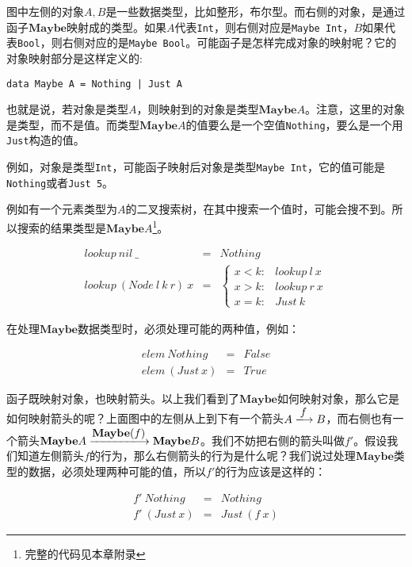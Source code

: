 \documentclass{article}
\begin{document}
\begin{example}
图中左侧的对象$A, B$是一些数据类型，比如整形，布尔型。而右侧的对象，是通过函子$\mathbf{Maybe}$映射成的类型。如果$A$代表\texttt{Int}，则右侧对应是\texttt{Maybe Int}，$B$如果代表\texttt{Bool}，则右侧对应的是\texttt{Maybe Bool}。可能函子是怎样完成对象的映射呢？它的对象映射部分是这样定义的:

\lstset{frame=none}
\begin{lstlisting}
data Maybe A = Nothing | Just A
\end{lstlisting}

也就是说，若对象是类型$A$，则映射到的对象是类型$\mathbf{Maybe}A$。注意，这里的对象是类型，而不是值。而类型$\mathbf{Maybe}A$的值要么是一个空值\texttt{Nothing}，要么是一个用\texttt{Just}构造的值。

例如，对象是类型\texttt{Int}，可能函子映射后对象是类型\texttt{Maybe Int}，它的值可能是\texttt{Nothing}或者\texttt{Just 5}。

例如有一个元素类型为$A$的二叉搜索树，在其中搜索一个值时，可能会搜不到。所以搜索的结果类型是$\mathbf{Maybe}A$\footnote{完整的代码见本章附录}。

\[
\begin{array}{rcl}
lookup\ nil\ \_ & = & Nothing \\
lookup\ (Node\ l\ k\ r)\ x & = & \begin{cases}
  x < k: & lookup\ l\ x \\
  x > k: & lookup\ r\ x \\
  x = k: & Just\ k
\end{cases}
\end{array}
\]

在处理$\mathbf{Maybe}$数据类型时，必须处理可能的两种值，例如：

\[
\begin{array}{rcl}
elem\ Nothing & = & False \\
elem\ (Just\ x) & = & True
\end{array}
\]

函子既映射对象，也映射箭头。以上我们看到了$\mathbf{Maybe}$如何映射对象，那么它是如何映射箭头的呢？上面图中的左侧从上到下有一个箭头$A \arrowto{f} B$，而右侧也有一个箭头$\mathbf{Maybe}A \arrowto{\mathbf{Maybe}(f)} \mathbf{Maybe}B$。我们不妨把右侧的箭头叫做$f'$。假设我们知道左侧箭头$f$的行为，那么右侧箭头的行为是什么呢？我们说过处理$\mathbf{Maybe}$类型的数据，必须处理两种可能的值，所以$f'$的行为应该是这样的：

\[
\begin{array}{rcl}
f'\ Nothing & = & Nothing \\
f'\ (Just\ x) & = & Just\ (f\ x)
\end{array}
\]


\end{example}
\end{document}
